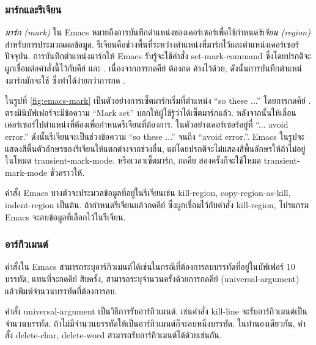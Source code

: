 \begin{thwbr}
\subsubsection{มาร์กและรีเจียน}
\emph{มาร์ก (mark)} ใน Emacs หมายถึงการบันทึกตำแหน่งของเคอร์เซอร์เพื่อใช้กำหนด\emph{รีเจียน (region)} สำหรับการประมวณผลข้อมูล. รีเจียนคือช่วงพื้นที่ระหว่างตำแหน่งที่มาร์กไว้และตำแหน่งเคอร์เซอร์ปัจจุบัน. การบันทึกตำแหน่งมาร์กให้ Emacs รับรู้จะใช้คำสั่ง set-mark-command ซึ่งโดยปรกติจะผูกเชื่อมต่อคำสั่งนี้ไว้กับคีย์  และ . เนื่องจากการกดคีย์  ต้องกด  ค้างไว้ด้วย, ดังนั้นการบันทึกตำแหน่งมาร์กมักจะใช้  ซึ่งทำได้ง่ายกว่าการกด .

\begin{figure}[!hbt]
\end{figure}

ในรูปที่ \ref{fig:emacs-mark} เป็นตัวอย่างการเซ็ตมาร์กเริ่มที่ตำแหน่ง ``so these ...'' โดยการกดคีย์ . ตรงมินิบัฟเฟอร์จะมีข้อความ ``Mark set'' บอกให้ผู้ใช้รู้ว่าได้เซ็ตมาร์กแล้ว. หลังจากนั้นให้เลื่อนเคอร์เซอร์ไปตำแหน่งที่ต้องเพื่อกำหนดรีเจียนที่ต้องการ. ในตัวอย่างเคอร์เซอร์อยู่ที่ ``... avoid error.'' ดังนั้นรีเจียนจะเป็นช่วงข้อความ ``so these ...'' จนถึง ``avoid error.''. Emacs ในรูปจะแสดงสีพื้นตัวอักษรของรีเจียนให้แตกต่างจากช่วงอื่น, แต่โดยปรกติจะไม่แสดงสีพื้นอักษรให้ถ้าไม่อยู่ในโหมด transient-mark-mode. หรือเวลาเซ็ตมาร์ก, กดคีย  สองครั้งก็จะใช้โหมด transient-mark-mode ชั่วคราวให้.

คำสั่ง Emacs บางตัวจะประมวลข้อมูลที่อยู่ในรีเจียนเช่น kill-region, copy-region-as-kill, indent-region เป็นต้น. ถ้ากำหนดรีเจียนแล้วกดคีย์  ซึ่งผูกเชื่อมไว้กับคำสั่ง kill-region, โปรแกรม Emacs จะลบข้อมูลที่เลือกไว้ในรีเจียน.

\subsubsection{อาร์กิวเมนต์}
คำสั่งใน Emacs สามารถระบุอาร์กิวเมนต์ได้เช่นในกรณีที่ต้องการลบบรรทัดที่อยู่ในบัฟเฟอร์ 10 บรรทัด, แทนที่จะกดคีย์  สิบครั้ง, สามารถระบุจำนวนครั้งด้วยการกดคีย์  (universal-argument) แล้วพิมพ์จำนวนบรรทัดที่ต้องการลบ. 

คำสั่ง universal-argument เป็นวิธีการรับอาร์กิวเมนต์. เช่นคำสั่ง kill-line จะรับอาร์กิวเมนต์เป็นจำนวนบรรทัด. ถ้าไม่มีจำนวนบรรทัดให้เป็นอาร์กิวเมนต์ก็จะลบหนึ่งบรรทัด. ในทำนองเดียวกัน, คำสั่ง delete-char, delete-word สามารถรับอาร์กิวเมนต์ได้ด้วยเช่นกัน.


\end{thwbr}
